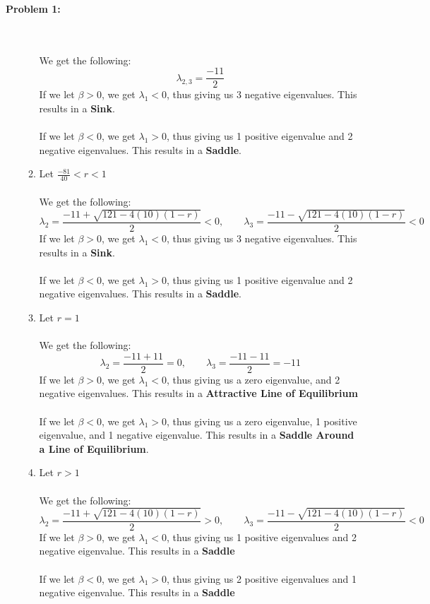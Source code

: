 \documentclass[11pt]{article}
\newenvironment{problem}[1]{\textbf{Problem #1: }}{\newpage}
\begin{document}
\begin{problem}{1}
\begin{enumerate}[label = (\alph*)]
\begin{enumerate}[label = (\alph*)]
 				\\ \\
 				We get the following:
 				\[\lambda_{2,3} = \frac{-11}{2}\]
 				If we let $\beta > 0$, we get $\lambda_1 < 0$, thus giving us 3 negative eigenvalues.  This results in a \textbf{Sink}.
 				\\ \\
 				If we let $\beta < 0$, we get $\lambda_1 > 0$, thus giving us 1 positive eigenvalue and 2 negative eigenvalues.  This results in a \textbf{Saddle}.
 				\\
 				\item Let $\frac{-81}{40} < r < 1$
 				\\ \\
 				We get the following:
 				\[\lambda_{2} = \frac{-11 + \sqrt{121 - 4(10)(1-r)}}{2} < 0, \qquad \lambda_{3} = \frac{-11 - \sqrt{121 - 4(10)(1-r)}}{2} < 0\]
 				If we let $\beta > 0$, we get $\lambda_1 < 0$, thus giving us 3 negative eigenvalues.  This results in a \textbf{Sink}.
 				\\ \\
 				If we let $\beta < 0$, we get $\lambda_1 > 0$, thus giving us 1 positive eigenvalue and 2 negative eigenvalues.  This results in a \textbf{Saddle}.
 				\newpage
 				\item Let $r = 1$
 				\\ \\
 				We get the following:
 				\[\lambda_2 = \frac{-11 + 11}{2} = 0, \qquad \lambda_3 = \frac{-11 - 11}{2} = -11\]
 				If we let $\beta > 0$, we get $\lambda_1 < 0$, thus giving us a zero eigenvalue, and 2 negative eigenvalues.  This results in a \textbf{Attractive Line of Equilibrium}
 				\\ \\
 				If we let $\beta < 0$, we get $\lambda_1 > 0$, thus giving us a zero eigenvalue, 1 positive eigenvalue, and 1 negative eigenvalue.  This results in a \textbf{Saddle Around a Line of Equilibrium}.
 				\\
 				\item Let $r > 1$
 				\\ \\
 				We get the following:
 				\[\lambda_{2} = \frac{-11 + \sqrt{121 - 4(10)(1-r)}}{2} > 0, \qquad \lambda_{3} = \frac{-11 - \sqrt{121 - 4(10)(1-r)}}{2} < 0\]
 				If we let $\beta > 0$, we get $\lambda_1 < 0$, thus giving us 1 positive eigenvalues and 2 negative eigenvalue.  This results in a \textbf{Saddle}
 				\\ \\
 				If we let $\beta < 0$, we get $\lambda_1 > 0$, thus giving us 2 positive eigenvalues and 1 negative eigenvalue.  This results in a \textbf{Saddle}
 			\end{enumerate}
	 	\end{enumerate}
	\end{problem}
\end{document}
